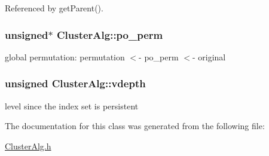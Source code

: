 \-Referenced by get\-Parent().

\hypertarget{classClusterAlg_af3d1d7c4ae0516ff9de725d3ff760b07}{
\subsubsection[{po\-\_\-perm}]{\setlength{\rightskip}{0pt plus 5cm}unsigned$\ast$ {\bf \-Cluster\-Alg\-::po\-\_\-perm}}}
\label{classClusterAlg_af3d1d7c4ae0516ff9de725d3ff760b07}
global permutation\-: permutation $<$-\/ po\-\_\-perm $<$-\/ original \hypertarget{classClusterAlg_ac1034ff983ce968e11edaf18c2b15cb2}{
\subsubsection[{vdepth}]{\setlength{\rightskip}{0pt plus 5cm}unsigned {\bf \-Cluster\-Alg\-::vdepth}}}
\label{classClusterAlg_ac1034ff983ce968e11edaf18c2b15cb2}
level since the index set is persistent 

\-The documentation for this class was generated from the following file\-:\begin{DoxyCompactItemize}
\item 
\hyperlink{ClusterAlg_8h}{\-Cluster\-Alg.\-h}\end{DoxyCompactItemize}
